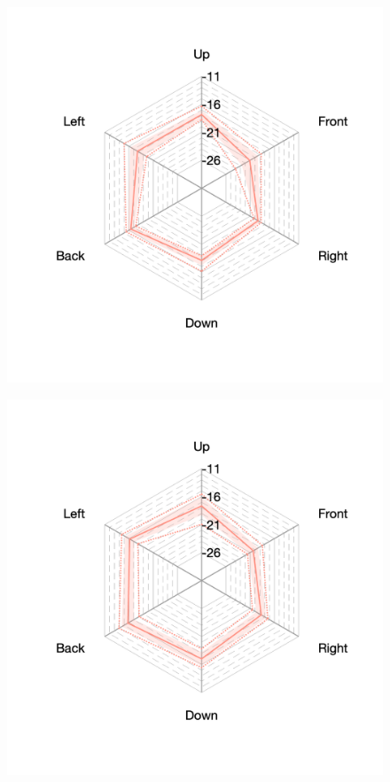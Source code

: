 \documentclass[11pt,a4j]{jreport}
\begin{document}
\begin{figure}[H]
  \begin{minipage}[b]{.33\textwidth}
    \centering
    \includegraphics[width=1\linewidth]{images/realHallDirSt/early_S07_allhall.png}
    \label{fig:S07early}
  \end{minipage}%
  \begin{minipage}[b]{.33\textwidth}
    \centering
    \includegraphics[width=1\linewidth]{images/realHallDirSt/early_S06_allhall.png}

\end{minipage}
\end{figure}
\end{document}
